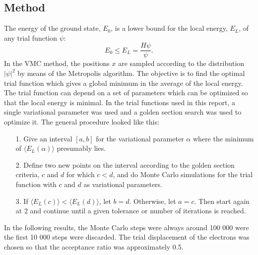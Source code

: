 \documentclass[twocolumn]{article}
\begin{document}
\begin{large}
\subsection*{Method}
The energy of the ground state, $E_0$, is a lower bound for the local energy, $E_L$, of any trial function $\psi$:
\begin{equation}
    E_0\leq E_L = \frac{H\psi}{\psi}.
\end{equation}
In the VMC method, the positions $x$ are sampled according to the distribution $|\psi|^2$ by means of the Metropolis algorithm. The objective is to find the optimal trial function which gives a global minimum in the average of the local energy. The trial function can depend on a set of parameters which can be optimized so that the local energy is minimal. In the trial functions used in this report, a single variational parameter was used and a golden section search was used to optimize it. The general procedure looked like this:
\begin{itemize}
    \item[1.] Give an interval $[a,b]$ for the variational parameter $\alpha$ where the minimum of $\langle E_L(\alpha)\rangle$ presumably lies. 
    \item[2.] Define two new points on the interval according to the golden section criteria, $c$ and $d$ for which $c<d$, and do Monte Carlo simulations for the trial function with $c$ and $d$ as variational parameters.
    \item[3.] If $\langle E_L(c)\rangle<\langle E_L(d)\rangle$, let $b=d$. Otherwise, let $a=c$. Then start again at 2 and continue until a given tolerance or number of iterations is reached. 
\end{itemize}
In the following results, the Monte Carlo steps were always around 100 000 were the first 10 000 steps were discarded. The trial displacement of the electrons was chosen so that the acceptance ratio was approximately 0.5.



\end{large}
\end{document}
